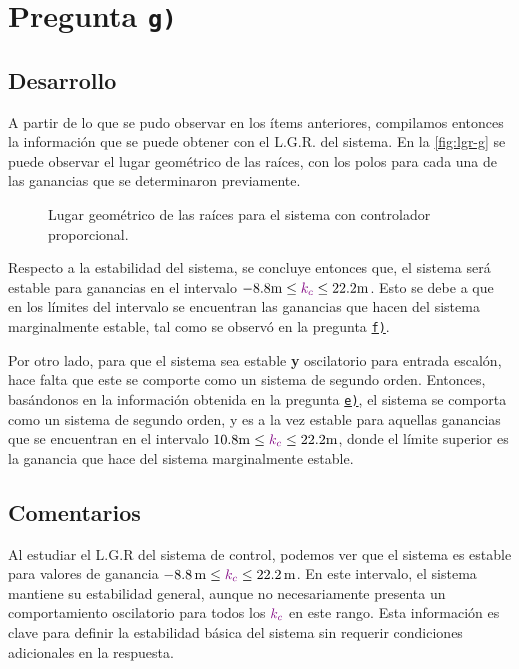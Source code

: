 \section{Pregunta \texttt{g)}}\label{pregunta-g}
\subsection{Desarrollo}

A partir de lo que se pudo observar en los ítems anteriores, compilamos entonces
la información que se puede obtener con el L.G.R. del sistema. En la \autoref{fig:lgr-g}
se puede observar el lugar geométrico de las raíces, con los polos para cada una
de las ganancias que se determinaron previamente.

\begin{figure}[ht]
  \centering
  
  \caption{Lugar geométrico de las raíces para el sistema con controlador proporcional.}
  \label{fig:lgr-g}
\end{figure}

Respecto a la estabilidad del sistema, se concluye entonces que, el sistema será
estable para ganancias en el intervalo $-8.8\unit{m} \leq \mora{k_{c}} \leq 22.2\unit{m}$.
Esto se debe a que en los límites del intervalo se encuentran las ganancias que
hacen del sistema marginalmente estable, tal como se observó en la pregunta
\hyperref[pregunta-f]{\texttt{f)}}.

Por otro lado, para que el sistema sea estable \textbf{y} oscilatorio para entrada
escalón, hace falta que este se comporte como un sistema de segundo orden. Entonces,
basándonos en la información obtenida en la pregunta \hyperref[pregunta-e]{\texttt{e)}},
el sistema se comporta como un sistema de segundo orden, y es a la vez estable para
aquellas ganancias que se encuentran en el intervalo $10.8\unit{m} \leq \mora{k_{c}} \leq 22.2\unit{m}$,
donde el límite superior es la ganancia que hace del sistema marginalmente estable.


\FloatBarrier
\subsection{Comentarios}


Al estudiar el L.G.R del sistema de control, podemos ver que el sistema es estable para valores de ganancia \( -8.8 \, \text{m} \leq \mathbin{\color{violet}k_c} \leq 22.2 \, \text{m} \). En este intervalo, el sistema mantiene su estabilidad general, aunque no necesariamente presenta un comportamiento oscilatorio para todos los \(\mathbin{\color{violet}k_c}\) en este rango. Esta información es clave para definir la estabilidad básica del sistema sin requerir condiciones adicionales en la respuesta.


